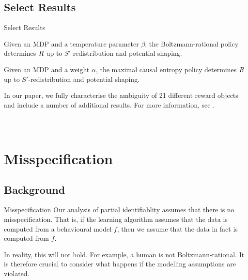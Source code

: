 \documentclass{beamer}
\begin{document}
\subsection{Select Results}

\begin{frame}{Select Results}
    \small
    \begin{theorem}
    Given an MDP and a temperature parameter $\beta$, the Boltzmann-rational policy determines $R$ up to
    $S'$-redistribution and potential shaping.
    \end{theorem}

    \vspace{0.5cm}
    \begin{theorem}
    Given an MDP and a weight $\alpha$, the maximal causal entropy policy determines $R$ up to
    $S'$-redistribution and potential shaping.
    \end{theorem}

    \vspace{0.5cm}
    In our paper, we fully characterise the ambiguity of 21 different reward objects and include a number of additional results. For more information, see \citet{skalse2022}.
\end{frame}

\begin{frame}
    \frametitle{}
    \centering
    \Large
    \textcolor{white}{Misspecification}
\end{frame}

\section{Misspecification}

\subsection{Background}

\begin{frame}{Misspecification}
    Our analysis of partial identifiablity assumes that there is no misspecification. That is, if the learning algorithm assumes that the data is computed from a behavioural model $f$, then we assume that the data in fact is computed from $f$.

    \vspace{0.5cm}
    In reality, this will not hold. For example, a human is not Boltzmann-rational. It is therefore crucial to consider what happens if the modelling assumptions are violated.
\end{frame}
\end{document}
